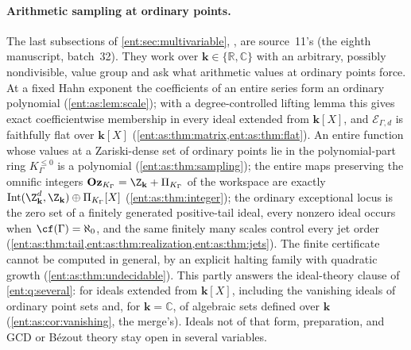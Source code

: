 \documentclass[11pt]{article}
\theoremstyle{plain}
\theoremstyle{plain}
\theoremstyle{plain}
\theoremstyle{definition}
\theoremstyle{definition}
\theoremstyle{definition}
\theoremstyle{definition}
\theoremstyle{remark}
\newcommand{\C}{\mathbb C}\newcommand{\R}{\mathbb R}
\newcommand{\K}{K_\Gamma}\newcommand{\KD}{K_\Delta}
\newcommand{\kk}{\mathbf k}\newcommand{\PP}{\mathbb P}
\newcommand{\Oz}{\mathbf{Oz}}\newcommand{\Ed}{\mathcal E_{\Gamma,d}}
\newcommand{\Kle}{K_\Gamma^{\le0}}\DeclareMathOperator{\Jac}{Jac}
\newcommand{\Zk}{\Z_{\kk}}\newcommand{\OzK}{\Oz_{\K}}
\newcommand{\PiK}{\Pi_{\K}}\newcommand{\pg}{\mathsf p}
\DeclareMathOperator{\Int}{Int}\DeclareMathOperator{\ct}{ct}
\begin{document}
\paragraph{Arithmetic sampling at ordinary points.}
The last subsections of \cref{ent:sec:multivariable},
, are source~11's (the
eighth manuscript, batch~32). They work over $\kk\in\{\R,\C\}$ with an
arbitrary, possibly nondivisible, value group and ask what arithmetic values
at ordinary points force. At a fixed Hahn exponent the coefficients of an
entire series form an ordinary polynomial (\cref{ent:as:lem:scale}); with a
degree-controlled lifting lemma this gives exact coefficientwise membership in
every ideal extended from $\kk[X]$, and $\Ed$ is faithfully flat over $\kk[X]$
(\cref{ent:as:thm:matrix,ent:as:thm:flat}). An entire function whose values
at a Zariski-dense set of ordinary points lie in the polynomial-part ring
$\Kle$ is a polynomial (\cref{ent:as:thm:sampling}); the entire maps preserving
the omnific integers $\OzK=\Zk+\PiK$ of the workspace are exactly
$\Int(\Zk^d,\Zk)\oplus\PiK[X]$ (\cref{ent:as:thm:integer}); the ordinary
exceptional locus is the zero set of a finitely generated positive-tail ideal,
every nonzero ideal occurs when $\cf(\Gamma)=\aleph_0$, and the same finitely
many scales control every jet order
(\cref{ent:as:thm:tail,ent:as:thm:realization,ent:as:thm:jets}). The finite
certificate cannot be computed in general, by an explicit halting family with
quadratic growth (\cref{ent:as:thm:undecidable}). This partly answers the
ideal-theory clause of \cref{ent:q:several}: for ideals extended from
$\kk[X]$, including the vanishing ideals of ordinary point sets and, for
$\kk=\C$, of algebraic sets defined over $\kk$ (\cref{ent:as:cor:vanishing},
the merge's). Ideals not of that form, preparation, and GCD or B\'ezout theory
stay open in several variables.
\end{document}
